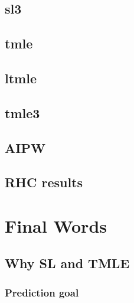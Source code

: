 \documentclass[
]{book}
\begin{document}
\hypertarget{sl3}{%
\section{sl3}\label{sl3}}

\hypertarget{tmle-1}{%
\section{tmle}\label{tmle-1}}

\hypertarget{ltmle}{%
\section{ltmle}\label{ltmle}}

\hypertarget{tmle3}{%
\section{tmle3}\label{tmle3}}

\hypertarget{aipw}{%
\section{AIPW}\label{aipw}}

\hypertarget{rhc-results}{%
\section{RHC results}\label{rhc-results}}

\hypertarget{final-words}{%
\chapter{Final Words}\label{final-words}}

\hypertarget{why-sl-and-tmle}{%
\section{Why SL and TMLE}\label{why-sl-and-tmle}}

\hypertarget{prediction-goal}{%
\subsection{Prediction goal}\label{prediction-goal}}
\end{document}
